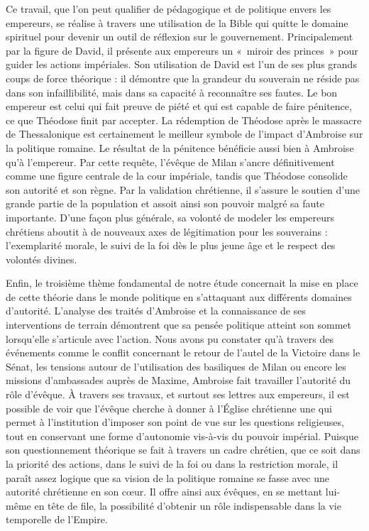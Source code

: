 Ce travail, que l'on peut qualifier de pédagogique et de politique envers les empereurs, se réalise à travers une utilisation de la Bible qui quitte le domaine spirituel pour devenir un outil de réflexion sur le gouvernement. Principalement par la figure de David, il présente aux empereurs un «~miroir des princes~» pour guider les actions impériales. Son utilisation de David est l'un de ses plus grands coups de force théorique : il démontre que la grandeur du souverain ne réside pas dans son infaillibilité, mais dans sa capacité à reconnaître ses fautes. Le bon empereur est celui qui fait preuve de piété et qui est capable de faire pénitence, ce que Théodose finit par accepter. La rédemption de Théodose après le massacre de Thessalonique est certainement le meilleur symbole de l'impact d'Ambroise sur la politique romaine. Le résultat de la pénitence bénéficie aussi bien à Ambroise qu'à l'empereur. Par cette requête, l'évêque de Milan s'ancre définitivement comme une figure centrale de la cour impériale, tandis que Théodose consolide son autorité et son règne. Par la validation chrétienne, il s'assure le soutien d'une grande partie de la population et assoit ainsi son pouvoir malgré sa faute importante. D'une façon plus générale, sa volonté de modeler les empereurs chrétiens aboutit à de nouveaux axes de légitimation pour les souverains : l'exemplarité morale, le suivi de la foi dès le plus jeune âge et le respect des volontés divines.

\bigskip

Enfin, le troisième thème fondamental de notre étude concernait la mise en place de cette théorie dans le monde politique en s'attaquant aux différents domaines d'autorité. L'analyse des traités d'Ambroise et la connaissance de ses interventions de terrain démontrent que sa pensée politique atteint son sommet lorsqu'elle s'articule avec l'action. Nous avons pu constater qu'à travers des événements comme le conflit concernant le retour de l'autel de la Victoire dans le Sénat, les tensions autour de l'utilisation des basiliques de Milan ou encore les missions d'ambassades auprès de Maxime, Ambroise fait travailler l'autorité du rôle d'évêque. À travers ses travaux, et surtout ses lettres aux empereurs, il est possible de voir que l'évêque cherche à donner à l'Église chrétienne une  qui permet à l'institution d'imposer son point de vue sur les questions religieuses, tout en conservant une forme d'autonomie vis-à-vis du pouvoir impérial. Puisque son questionnement théorique se fait à travers un cadre chrétien, que ce soit dans la priorité des actions, dans le suivi de la foi ou dans la restriction morale, il paraît assez logique que sa vision de la politique romaine se fasse avec une autorité chrétienne en son cœur. Il offre ainsi aux évêques, en se mettant lui-même en tête de file, la possibilité d'obtenir un rôle indispensable dans la vie temporelle de l'Empire.

